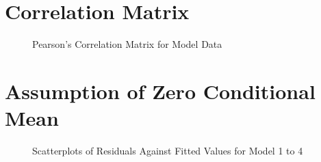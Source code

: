 \clearpage

\section{Correlation Matrix} \label{appendix:corrplot}

\begin{figure}[H]
    \centering
    
    \caption{Pearson's Correlation Matrix for Model Data}
    \label{fig:corr_plot}
\end{figure}

\clearpage

\section{Assumption of Zero Conditional Mean} \label{appendix:zeroconmean}
\begin{figure}[H]
    \centering
    
    \caption{Scatterplots of Residuals Against Fitted Values for Model 1 to 4}
    \label{fig:zeroconmean}
\end{figure}



